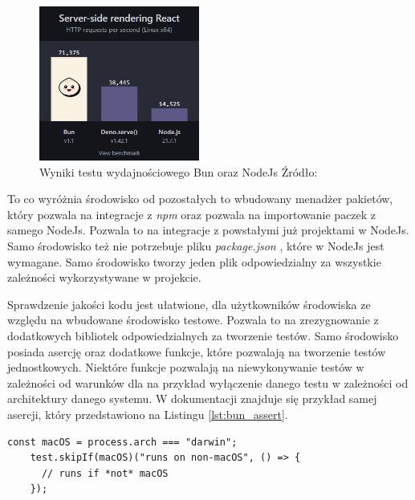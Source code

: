 \begin{figure}[H]
  \centering
  \includegraphics[width=0.47\textwidth]{Figures/bun_bench.png}
  \caption{Wyniki testu wydajnościowego Bun oraz NodeJs Źródło: \cite{bun_test}}
  \label{fig:bun_bench}
\end{figure}

To co wyróżnia środowisko od pozostałych to wbudowany menadżer pakietów, który pozwala na integracje z \textit{npm} \cite{npm} oraz pozwala na importowanie paczek z samego NodeJs. Pozwala to na integracje z powstałymi już projektami w NodeJs. Samo środowisko też nie potrzebuje pliku \textit{package.json} \cite{package_structure}, które w NodeJs jest wymagane. Samo środowisko tworzy jeden plik odpowiedzialny za wszystkie zależności wykorzystywane w projekcie.

Sprawdzenie jakości kodu jest ułatwione, dla użytkowników środowiska ze względu na wbudowane środowisko testowe. Pozwala to na zrezygnowanie z dodatkowych bibliotek odpowiedzialnych za tworzenie testów. Samo środowisko posiada asercję oraz dodatkowe funkcje, które pozwalają na tworzenie testów jednostkowych. Niektóre funkcje pozwalają na niewykonywanie testów w zależności od warunków dla na przykład wyłączenie danego testu w zależności od architektury danego systemu. W dokumentacji znajduje się przykład samej asercji, który przedstawiono na Listingu \ref{lst:bun_assert}.

\begin{centering}
  \begin{lstlisting}[caption={Przykład asercji w środowisku Bun},label={lst:bun_assert},captionpos=b]
    const macOS = process.arch === "darwin";
    test.skipIf(macOS)("runs on non-macOS", () => {
      // runs if *not* macOS
    });
  \end{lstlisting}
\end{centering}
